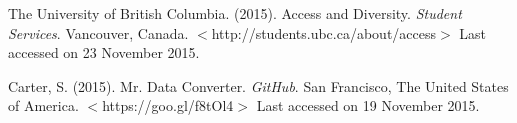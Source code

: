 \documentclass[11pt, oneside]{article}   	%
\begin{document}
\cleardoublepage

\begin{thebibliography}{10}

 The University of British Columbia. (2015). Access and Diversity. \textit{Student Services}. Vancouver, Canada. $<$http://students.ubc.ca/about/access$>$ Last accessed on 23 November 2015.

 Carter, S. (2015). Mr. Data Converter. \textit{GitHub}. San Francisco, The United States of America. $<$https://goo.gl/f8tOl4$>$ Last accessed on 19 November 2015.

\end{thebibliography}

%






\end{document}

